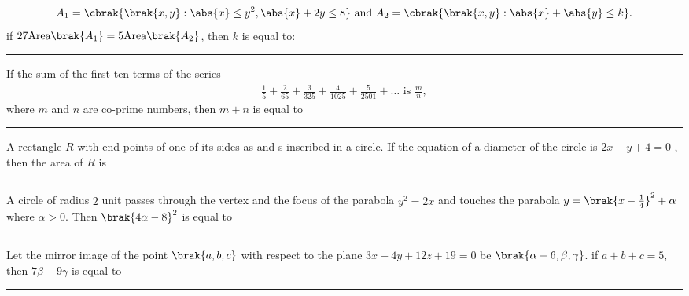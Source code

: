     \hfill{}

    \item 
    \begin{align*}
        A_1 = \cbrak{\brak{x,y} : \abs{x} \leq y^2, \abs{x} + 2y \leq 8} 
        \text{ and }
        A_2 = \cbrak{\brak{x,y} : \abs{x} + \abs{y} \leq k}.
    \end{align*}
    if $27\text{Area}\brak{A_1} = 5\text{Area}\brak{A_2}$, then $k$ is equal to: \rule{1cm}{0.1pt}

    \hfill{}

    \item 
    If the sum of the first ten terms of the series 
    \begin{align*}
        \frac{1}{5} + \frac{2}{65} + \frac{3}{325} + \frac{4}{1025} + \frac{5}{2501} + \dots \text{ is } \frac{m}{n},
    \end{align*}
    where $m$ and $n$ are co-prime numbers, then $m + n$ is equal to \rule{1cm}{0.1pt}

    \hfill{}

    \item 
    A rectangle $R$ with end points of one of its sides as  and  s inscribed in a circle. If the equation of a diameter of the circle is  $2x - y + 4 = 0$ , then the area of $R$ is \rule{1cm}{0.1pt}

    \hfill{}

    \item 
    A circle of radius $2$ unit passes through the vertex and the focus of the parabola $y^2 =  2x$ and touches the parabola $y = \brak{x-\frac{1}{4}}^2 + \alpha$ where $\alpha > 0$. Then $\brak{4\alpha - 8}^2$ is equal to \rule{1cm}{0.1pt}

    \hfill{}

    \item 
    Let the mirror image of the point $\brak{a, b, c}$ with respect to the plane $ 3x - 4y + 12z + 19 = 0 $ be $\brak{\alpha - 6, \beta, \gamma}$. if $a + b + c = 5$, then $7\beta - 9\gamma$ is equal to \rule{1cm}{0.1pt}
    
    \hfill{}
    
%
